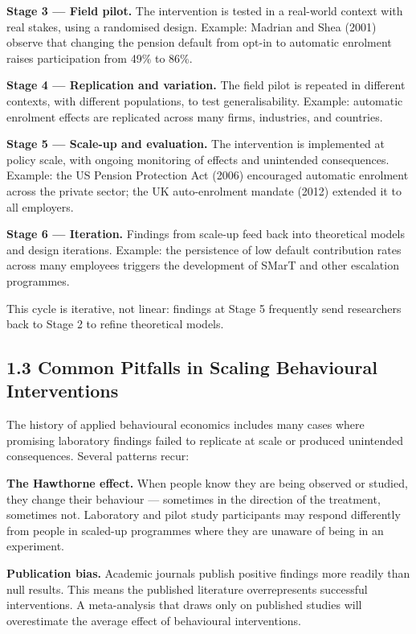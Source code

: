 \documentclass[12pt, letterpaper]{article}
\begin{document}
\textbf{Stage 3 --- Field pilot.} The intervention is tested in a real-world context with real stakes, using a randomised design. Example: Madrian and Shea (2001) observe that changing the pension default from opt-in to automatic enrolment raises participation from 49\% to 86\%.

\textbf{Stage 4 --- Replication and variation.} The field pilot is repeated in different contexts, with different populations, to test generalisability. Example: automatic enrolment effects are replicated across many firms, industries, and countries.

\textbf{Stage 5 --- Scale-up and evaluation.} The intervention is implemented at policy scale, with ongoing monitoring of effects and unintended consequences. Example: the US Pension Protection Act (2006) encouraged automatic enrolment across the private sector; the UK auto-enrolment mandate (2012) extended it to all employers.

\textbf{Stage 6 --- Iteration.} Findings from scale-up feed back into theoretical models and design iterations. Example: the persistence of low default contribution rates across many employees triggers the development of SMarT and other escalation programmes.

This cycle is iterative, not linear: findings at Stage 5 frequently send researchers back to Stage 2 to refine theoretical models.


\subsection{1.3 Common Pitfalls in Scaling Behavioural Interventions}


The history of applied behavioural economics includes many cases where promising laboratory findings failed to replicate at scale or produced unintended consequences. Several patterns recur:

\textbf{The Hawthorne effect.} When people know they are being observed or studied, they change their behaviour --- sometimes in the direction of the treatment, sometimes not. Laboratory and pilot study participants may respond differently from people in scaled-up programmes where they are unaware of being in an experiment.

\textbf{Publication bias.} Academic journals publish positive findings more readily than null results. This means the published literature overrepresents successful interventions. A meta-analysis that draws only on published studies will overestimate the average effect of behavioural interventions.
\end{document}
